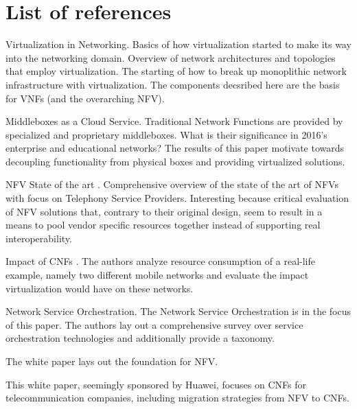 \section{List of references}
\begin{description}[style=sameline, leftmargin=1em, font=\normalfont]
	\item[Pfaff \cite{pfaff2009extending}]  Virtualization in Networking. Basics of how virtualization started to make its way into the networking domain. Overview of network architectures and topologies that employ virtualization. The starting of how to break up monoplithic network infrastructure with virtualization. The components decsribed here are the basis for VNFs (and the overarching NFV). 
	
	\item[Sherry \cite{sherry2016middleboxes}] Middleboxes as a Cloud Service. Traditional Network Functions are provided by specialized and proprietary middleboxes. What is their significance in 2016's enterprise and educational networks? The results of this paper motivate towards decoupling functionality from physical boxes and providing virtualized solutions.
	
	\item [Mijumbi \cite{mijumbi2016network}] NFV State of the art . Comprehensive overview of the state of the art of NFVs with focus on Telephony Service Providers. Interesting because critical evaluation of NFV solutions that, contrary to their original design, seem to result in a means to pool vendor specific resources together instead of supporting real interoperability. 
	
	\item [Bilal \cite{bilal2016impact}] Impact of CNFs . The authors analyze resource consumption of a real-life example, namely two different mobile networks and evaluate the impact virtualization would have on these networks. 
	
	\item [De Sousa \cite{de2018network}] Network Service Orchestration. The Network Service Orchestration is in the focus of this paper. The authors lay out a comprehensive survey over service orchestration technologies and additionally provide a taxonomy.  
	
	\item[NFV White Paper \cite{nfv_wp}]  The white paper lays out the foundation for NFV. 
	
	\item [AM White Paper \cite{evolutionnfv}] This white paper, seemingly sponsored by  Huawei, focuses on CNFs for telecommunication companies, including migration strategies from NFV to CNFs. 
	

\end{description}
